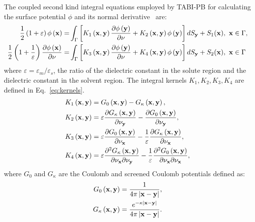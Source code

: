 \documentclass[12pt,titlepage]{article}
\begin{document}
The coupled second kind integral equations employed by TABI-PB for calculating the surface potential $\phi$ and its normal derivative~\cite{Juffer1991} are: 
\begin{equation} \label{eq:integraleq}
	\begin{split}
		\frac{1}{2}\left(1+\varepsilon\right)\phi\left({\bf x}\right) =& \int_\Gamma\left[K_1\left({\bf x}, {\bf y}\right) \frac{\partial \phi\left({\bf y}\right)}{\partial \nu} + K_2\left({\bf x}, {\bf y}\right) \phi\left({\bf y}\right) \right]dS_{\bf y} + S_1({\bf x}), \ {\bf x} \in \Gamma, \\ %
		\frac{1}{2}\left(1+\frac{1}{\varepsilon}\right) \frac{\partial \phi\left({\bf x}\right)}{\partial \nu} =& \int_\Gamma\left[K_3\left({\bf x}, {\bf y}\right) \frac{\partial \phi\left({\bf y}\right)}{\partial \nu} + K_4\left({\bf x}, {\bf y}\right) \phi\left({\bf y}\right) \right]dS_{\bf y} + S_2({\bf x}), \ {\bf x} \in \Gamma 
	\end{split}
\end{equation} 
%
where $\varepsilon = \varepsilon_m / \varepsilon_s$, the ratio of the dielectric constant in the solute region and the dielectric constant in the solvent region.
The integral kernels $K_1, K_2, K_3, K_4$ are defined in Eq.~\ref{eq:kernels}.
%
\begin{equation}
	\begin{split}
		K_1\left({\bf x}, {\bf y}\right) &= G_0\left({\bf x}, {\bf y}\right) - G_\kappa\left({\bf x}, {\bf y}\right), \\
		K_2\left({\bf x}, {\bf y}\right) &= \varepsilon \frac{\partial G_\kappa\left({\bf x}, {\bf y}\right)}{\partial \nu_{\bf y}} -\frac{\partial G_0\left({\bf x}, {\bf y}\right)}{\partial \nu_{\bf y}}, \\
		K_3\left({\bf x}, {\bf y}\right) &= \varepsilon \frac{\partial G_0\left({\bf x}, {\bf y}\right)}{\partial \nu_{\bf x}} -\frac{1}{\varepsilon}\frac{\partial G_\kappa\left({\bf x}, {\bf y}\right)}{\partial \nu_{\bf x}}, \\
		K_4\left({\bf x}, {\bf y}\right) &= \varepsilon \frac{\partial^2 G_\kappa\left({\bf x}, {\bf y}\right)}{\partial \nu_{\bf x} \partial \nu_{\bf y}} -\frac{1}{\varepsilon}\frac{\partial^2 G_0\left({\bf x}, {\bf y}\right)}{\partial \nu_{\bf x} \partial \nu_{\bf x}},
		\label{eq:kernels}
	\end{split}
\end{equation}
%
where $G_0$ and $G_\kappa$ are the Coulomb and screened Coulomb potentials defined as:
%
\begin{equation}
	\begin{split}
		G_0\left({\bf x}, {\bf y}\right) &= \frac{1}{4\pi \left|{\bf x} - {\bf y}\right|}, \\ G_\kappa\left({\bf x}, {\bf y}\right) &= \frac{e^{-\kappa\left|{\bf x} - {\bf y}\right|}}{4\pi \left|{\bf x} - {\bf y}\right|}.
	\end{split}
\end{equation}
\end{document}
